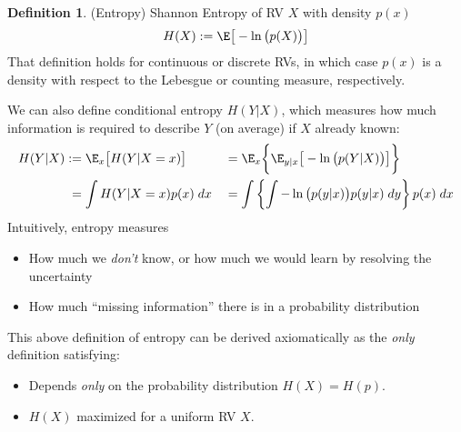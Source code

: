 \documentclass[12pt]{article}
\theoremstyle{plain}
\theoremstyle{definition}
\newtheorem{defn}[thm]{Definition}
\theoremstyle{remark}
\newcommand{\ra}{\rightarrow}
\begin{document}
\begin{defn}(Entropy)
Shannon Entropy of RV $X$ with density $p(x)$
\begin{align*}
  H(X)
  :=
  \E\big[-\ln\big(p(X)\big)\big]
\end{align*}
That definition holds for continuous or discrete RVs, in which case
$p(x)$ is a density with respect to the Lebesgue or counting measure,
respectively.

We can also define conditional entropy $H(Y|X)$, which measures how much
information is required to describe $Y$ (on average) if $X$ already
known:
\begin{alignat*}{3}
  H(Y|X)
  &:= \E_x\big[H(Y|X=x)\big]
  &&= \E_x\bigg\{\E_{y|x}\big[-\ln\big(p(Y|X)\big)\big]\bigg\}
  \\
  &\;= \int H(Y|X=x)p(x)\;dx
  &&= \int\left\{
    \int
    -\ln\big(p(y|x)\big)
    p(y|x)\;dy
  \right\}p(x)\;dx
\end{alignat*}
Intuitively, entropy measures
\begin{itemize}
  \item How much we \emph{don't} know, or
    how much we would learn by resolving the uncertainty
  \item How much ``missing information'' there is in a probability
    distribution
\end{itemize}
This above definition of entropy can be derived axiomatically as the
\emph{only} definition satisfying:
\begin{itemize}
  \item Depends \emph{only} on the probability distribution
    $H(X)=H(p)$.
  \item $H(X)$ maximized for a uniform RV $X$.


\end{itemize}
\end{defn}
\end{document}
